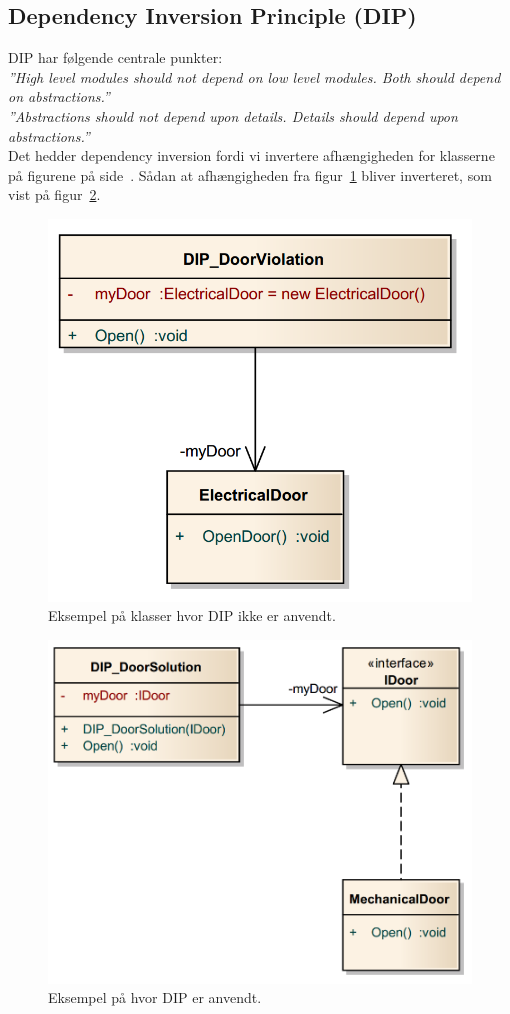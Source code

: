 \subsection{Dependency Inversion Principle (DIP)}
DIP har følgende centrale punkter:\\

\textit{''High level modules should not depend on low level modules. Both should depend on abstractions.''}\\

\textit{''Abstractions should not depend upon details. Details should depend upon abstractions.''}\\

Det hedder dependency inversion fordi vi invertere afhængigheden for klasserne på figurene på side~\pageref{fig:dipright}. Sådan at afhængigheden fra figur~\ref{fig:dipwrong} bliver inverteret, som vist på figur~\ref{fig:dipright}.\\

\begin{figure}[H]
	\centering
	\includegraphics[width=0.5\linewidth]{figs/DIP/dipwrong}
	\caption[DIP eksempel 1]{Eksempel på klasser hvor DIP ikke er anvendt.}
	\label{fig:dipwrong}
\end{figure}

\begin{figure}[H]
	\centering
	\includegraphics[width=0.6\linewidth]{figs/DIP/dipright}
	\caption[DIP eksempel 2]{Eksempel på hvor DIP er anvendt.}
	\label{fig:dipright}
\end{figure}

